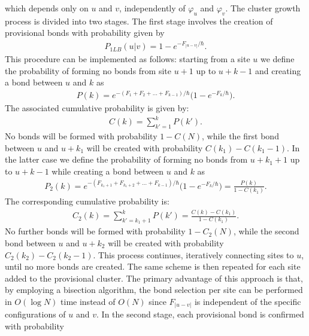 \documentclass[aps,notitlepage,twocolumn,prl,nolongbibliography,superscriptaddress]{revtex4-2}
\begin{document}
which depends only on $u$ and $v$, independently of $\varphi_u$ and $\varphi_v$. The cluster growth process is divided into two stages. The first stage involves the creation of provisional bonds with probability given by
\begin{equation}\label{eqn:luijten_provv}\begin{split}
    P_{1LB}(u|v)  = 1 -e^{-F_{\left|u-v\right|}/\hbar}.
    \end{split}
\end{equation}
This procedure can be implemented as follows: starting from a site $u$ we define the probability of forming no bonds from site $u+1$ up to $u+k-1$ and creating a bond between $u$ and $k$ as
\begin{equation}\label{eqn:luijten_provv_up_to_k}\begin{split}
    P(k) = e^{-(F_1+F_2+\dots+F_{k-1})/\hbar}\biggl(1-e^{-F_{k}/\hbar}\biggr).
    \end{split}
\end{equation}
The associated cumulative probability is given by:
\begin{equation}\label{eqn:luijten_cum}\begin{split}
    C(k) = \sum_{k'=1}^{k} P(k').
    \end{split}
\end{equation}
No bonds will be formed with probability $1-C(N)$, while the first bond between $u$ and $u+k_1$ will be created with probability $C(k_1)-C(k_1-1)$. In the latter case we define the probability of forming no bonds from $u+k_1+1$ up to $u+k-1$ while creating a bond between $u$ and $k$ as
\begin{equation*}\begin{split}
    P_2(k) = e^{-(F_{k_1+1}+F_{k_1+2}+\dots+F_{k-1})/\hbar}\biggl(1-e^{-F_{k}/\hbar}\biggr) = \frac{P(k)}{1-C(k_1)}.
    \end{split}
\end{equation*}
The corresponding cumulative probability is:
\begin{equation}\begin{split}
    C_2(k) = \sum_{k'=k_1+1}^{k} P(k') = \frac{C(k)-C(k_1)}{1-C(k_1)}.
    \end{split}
\end{equation}
No further bonds will be formed with probability $1-C_2(N)$, while the second bond between $u$ and $u+k_2$ will be created with probability $C_2(k_2)-C_2(k_2-1)$. This process continues, iteratively connecting sites to $u$, until no more bonds are created. The same scheme is then repeated for each site added to the provisional cluster. The primary advantage of this approach is that, by employing a bisection algorithm, the bond selection per site can be performed in $O(\log N)$ time instead of $O(N)$ since $F_{\left|u-v\right|}$ is independent of the specific configurations of $u$ and $v$. In the second stage, each provisional bond is confirmed with probability
\end{document}
